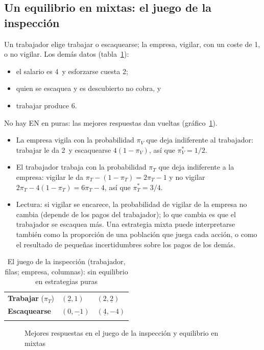 \documentclass[11pt]{article}
\begin{document}
\subsection*{Un equilibrio en mixtas: el juego de la inspección}

Un trabajador elige trabajar o escaquearse; la empresa, vigilar, con un coste de 1, o no vigilar. Los demás datos (tabla~\ref{tab:inspeccion}):
\begin{itemize}
\item el salario es 4~y esforzarse cuesta 2;
\item quien se escaquea y es descubierto no cobra, y
\item trabajar produce 6.
\end{itemize}
No hay EN en puras: las mejores respuestas dan vueltas (gráfico~\ref{fig:inspeccion}).

\begin{itemize}
\item La empresa vigila con la probabilidad $\pi_V$ que deja indiferente al trabajador: trabajar le da 2~y escaquearse $4(1-\pi_V)$, así que $\pi_V^*=1/2$.
\item El trabajador trabaja con la probabilidad $\pi_T$ que deja indiferente a la empresa: vigilar le da $\pi_T-(1-\pi_T)=2\pi_T-1$ y no vigilar $2\pi_T-4(1-\pi_T)=6\pi_T-4$, así que $\pi_T^*=3/4$.
\item Lectura: si vigilar se encarece, la probabilidad de vigilar de la empresa no cambia (depende de los pagos del trabajador); lo que cambia es que el trabajador se escaquea más. Una estrategia mixta puede interpretarse también como la proporción de una población que juega cada acción, o como el resultado de pequeñas incertidumbres sobre los pagos de los demás\nocite{Harsanyi1973Games}.
\end{itemize}
\begin{table}[H]
\centering
\caption{El juego de la inspección (trabajador, filas; empresa, columnas): sin equilibrio en estrategias puras}\label{tab:inspeccion}
\begin{tabular}{>{\centering\arraybackslash}m{2.8cm}|>{\centering\arraybackslash}m{2.6cm}|>{\centering\arraybackslash}m{2.6cm}|}
\multicolumn{1}{c}{} & \multicolumn{1}{c}{\textbf{Vigilar} ($\pi_V$)} & \multicolumn{1}{c}{\textbf{No vigilar}}\\
\cline{2-3}
\textbf{Trabajar} ($\pi_T$) & $(\underline{2},1)$ & $(2,\underline{2})$\\
\cline{2-3}
\textbf{Escaquearse} & $(0,\underline{-1})$ & $(\underline{4},-4)$\\
\cline{2-3}
\end{tabular}
\end{table}
\begin{figure}[H]
\centering
\caption{Mejores respuestas en el juego de la inspección y equilibrio en mixtas}\label{fig:inspeccion}
\end{figure}
\end{document}
